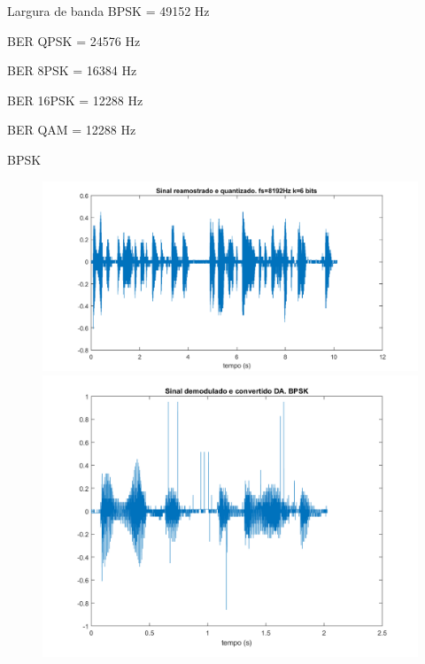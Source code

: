 ﻿\documentclass[mathserif]{beamer}
\begin{document}
	\begin{frame}{Largura de banda}
		BPSK = 49152 Hz


		BER QPSK = 24576 Hz


		BER 8PSK = 16384 Hz


		BER 16PSK = 12288 Hz


		BER QAM = 12288 Hz
		
	\end{frame}
	

	\begin{frame}{BPSK}
		\begin{figure}
			\centering
			\includegraphics[scale=0.3]{../NossoCodigo2/figuras/0quantizado.png}
			\quad
			\includegraphics[scale=0.3]{../NossoCodigo2/figuras/modula13.png}
		\end{figure}
	\end{frame}
\end{document}
